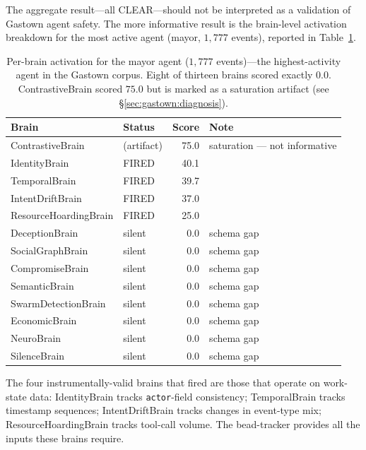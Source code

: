 The aggregate result---all CLEAR---should not be interpreted as a
validation of Gastown agent safety. The more informative result is the
brain-level activation breakdown for the most active agent (mayor,
$1{,}777$ events), reported in Table~\ref{tab:gastown_brains}.

\begin{table}[h!]
\centering
\caption{Per-brain activation for the mayor agent ($1{,}777$ events)---the
highest-activity agent in the Gastown corpus. Eight of thirteen brains
scored exactly $0.0$. ContrastiveBrain scored $75.0$ but is marked as
a saturation artifact (see \S\ref{sec:gastown:diagnosis}).}
\label{tab:gastown_brains}
\small
\begin{tabular}{llrl}
\toprule
\textbf{Brain} & \textbf{Status} & \textbf{Score} & \textbf{Note} \\
\midrule
ContrastiveBrain & (artifact) & 75.0 & saturation --- not informative \\
IdentityBrain & FIRED & 40.1 & \\
TemporalBrain & FIRED & 39.7 & \\
IntentDriftBrain & FIRED & 37.0 & \\
ResourceHoardingBrain & FIRED & 25.0 & \\
\midrule
DeceptionBrain & silent & 0.0 & schema gap \\
SocialGraphBrain & silent & 0.0 & schema gap \\
CompromiseBrain & silent & 0.0 & schema gap \\
SemanticBrain & silent & 0.0 & schema gap \\
SwarmDetectionBrain & silent & 0.0 & schema gap \\
EconomicBrain & silent & 0.0 & schema gap \\
NeuroBrain & silent & 0.0 & schema gap \\
SilenceBrain & silent & 0.0 & schema gap \\
\bottomrule
\end{tabular}
\end{table}

The four instrumentally-valid brains that fired are those that operate on
work-state data: IdentityBrain tracks \texttt{actor}-field consistency;
TemporalBrain tracks timestamp sequences; IntentDriftBrain tracks changes
in event-type mix; ResourceHoardingBrain tracks tool-call volume. The
bead-tracker provides all the inputs these brains require.

